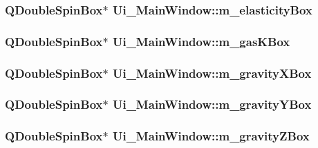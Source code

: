 \label{classUi__MainWindow_aed4f32d456ab04871cd8d062baec1480}
\hypertarget{classUi__MainWindow_adeba4ba7f56681d9962322bb7c8e33f5}{
\subsubsection[{m\_\-elasticityBox}]{\setlength{\rightskip}{0pt plus 5cm}QDoubleSpinBox$\ast$ {\bf Ui\_\-MainWindow::m\_\-elasticityBox}}}
\label{classUi__MainWindow_adeba4ba7f56681d9962322bb7c8e33f5}
\hypertarget{classUi__MainWindow_a4f9f72f5874dab4be00f166117b0adc3}{
\subsubsection[{m\_\-gasKBox}]{\setlength{\rightskip}{0pt plus 5cm}QDoubleSpinBox$\ast$ {\bf Ui\_\-MainWindow::m\_\-gasKBox}}}
\label{classUi__MainWindow_a4f9f72f5874dab4be00f166117b0adc3}
\hypertarget{classUi__MainWindow_adc503564af3df70c4a6cde0c93a079c2}{
\subsubsection[{m\_\-gravityXBox}]{\setlength{\rightskip}{0pt plus 5cm}QDoubleSpinBox$\ast$ {\bf Ui\_\-MainWindow::m\_\-gravityXBox}}}
\label{classUi__MainWindow_adc503564af3df70c4a6cde0c93a079c2}
\hypertarget{classUi__MainWindow_adddb9f038cf6f566a7cf0ba0802afaf8}{
\subsubsection[{m\_\-gravityYBox}]{\setlength{\rightskip}{0pt plus 5cm}QDoubleSpinBox$\ast$ {\bf Ui\_\-MainWindow::m\_\-gravityYBox}}}
\label{classUi__MainWindow_adddb9f038cf6f566a7cf0ba0802afaf8}
\hypertarget{classUi__MainWindow_aec3524ddb9738f81ad14b0409c23a98c}{
\subsubsection[{m\_\-gravityZBox}]{\setlength{\rightskip}{0pt plus 5cm}QDoubleSpinBox$\ast$ {\bf Ui\_\-MainWindow::m\_\-gravityZBox}}}
